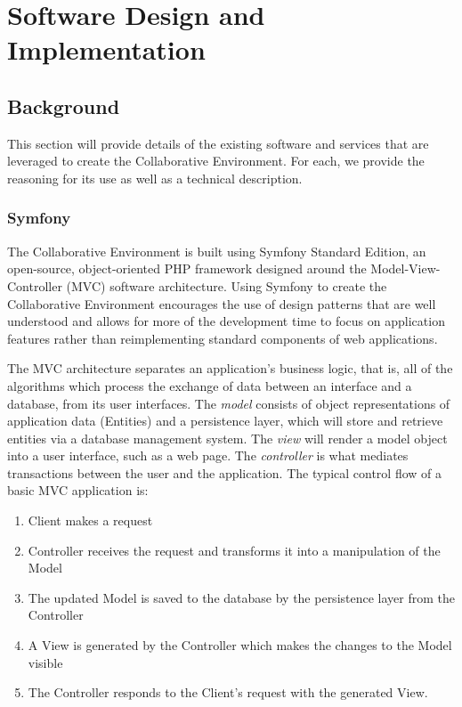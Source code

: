 \chapter{Software Design and Implementation}
\label{chap:software-design}
 
\section{Background}
This section will provide details of the existing software and services that are leveraged to create the Collaborative Environment. For each, we provide the reasoning for its use as well as a technical description.

\subsection{Symfony}
\label{subsec:design-background-symfony}
The Collaborative Environment is built using Symfony Standard Edition, an open-source, object-oriented PHP framework designed around the Model-View-Controller (MVC) software architecture. Using Symfony to create the Collaborative Environment encourages the use of design patterns that are well understood and allows for more of the development time to focus on application features rather than reimplementing standard components of web applications.

The MVC architecture separates an application's business logic, that is, all of the algorithms which process the exchange of data between an interface and a database, from its user interfaces. The \emph{model} consists of object representations of application data (Entities) and a persistence layer, which will store and retrieve entities via a database management system. The \emph{view} will render a model object into a user interface, such as a web page. The \emph{controller} is what mediates transactions between the user and the application. The typical control flow of a basic MVC application is:

\begin{singlespacing}
\begin{enumerate}
	\item Client makes a request
	\item Controller receives the request and transforms it into a manipulation of the Model
	\item The updated Model is saved to the database by the persistence layer from the Controller
	\item A View is generated by the Controller which makes the changes to the Model visible
	\item The Controller responds to the Client's request with the generated View.
\end{enumerate}
\end{singlespacing}

